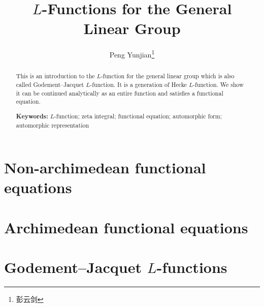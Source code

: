 \documentclass[twoside]{article}
\begin{document}
\title{$L$-Functions for the General \\ Linear Group}
\author{Peng Yunjian\footnote{彭云剑}}

\begin{abstract}
  This is an introduction to the $L$-function for the general linear group which is also called Godement--Jacquet $L$-function. It is a generation of Hecke $L$-function. We show it can be continued analytically as an entire function and satisfies a functional equation. 
  
  \bigskip
  \noindent
  \textbf{Keywords:} $L$-function; zeta integral; functional equation; automorphic form; automorphic representation
\end{abstract}

\tableofcontents

\section{Non-archimedean functional equations}






\section{Archimedean functional equations}




\section{Godement--Jacquet \texorpdfstring{$L$}{L}-functions}






\printbibliography
\end{document}
